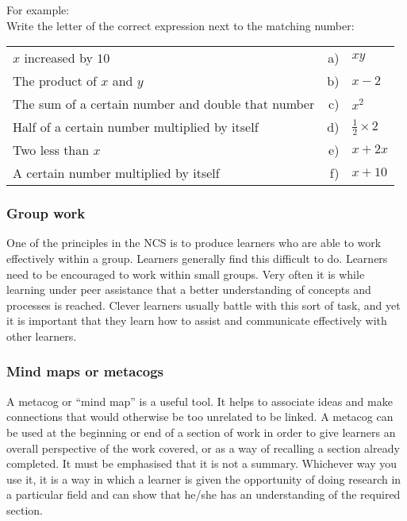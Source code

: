 For example: \\
Write the letter of the correct expression next to the matching number:\\
\begin{table}[H]
 \begin{center}
  \begin{tabular}{lrl} 
$x$ increased by $10$&					a)	&$xy$ \\
The product of  $x$ and $ y$		 &		 b)	&$x-2$\\
The sum of a certain number and double that number	&		c)&	$x^2$\\

Half of a certain number multiplied by itself	&	d)&	$\frac{1}{2} \times 2$\\
Two less than  $x$&					e)&	$x + 2x  $\\
A certain number multiplied by itself	&		f)&	$x + 10$\\
  \end{tabular}
 \end{center}
\end{table}

\subsubsection{Group work}
One of the principles in the NCS is to produce learners who are able to work effectively within a group. Learners generally find this difficult to do. Learners need to be encouraged to work within small groups. Very often it is while learning under peer assistance that a better understanding of concepts and processes is reached. Clever learners usually battle with this sort of task, and yet it is important that they learn how to assist and communicate effectively with other learners. \par

\subsubsection{Mind maps or metacogs}
A metacog or “mind map” is a useful tool. It helps to associate ideas and make connections that would otherwise be too unrelated to be linked. A metacog can be used at the beginning or end of a section of work in order to give learners an overall perspective of the work covered, or as a way of recalling a section already completed. It must be emphasised that it is not a summary. Whichever way you use it, it is a way in which a learner is given the opportunity of doing research in a particular field and can show that he/she has an understanding of the required section. \par 

